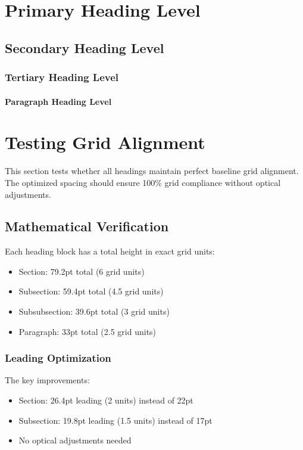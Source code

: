 \documentclass[11pt,a4paper]{article}
\begin{document}
\showgrid

\section{Primary Heading Level}
\lipsum[1][1-3]

\subsection{Secondary Heading Level}
\lipsum[2][1-3]

\subsubsection{Tertiary Heading Level}
\lipsum[3][1-3]

\paragraph{Paragraph Heading Level}
\lipsum[4][1-3]

\section{Testing Grid Alignment}
This section tests whether all headings maintain perfect baseline grid alignment.
The optimized spacing should ensure 100\% grid compliance without optical adjustments.

\subsection{Mathematical Verification}
Each heading block has a total height in exact grid units:
\begin{itemize}
\item Section: 79.2pt total (6 grid units)
\item Subsection: 59.4pt total (4.5 grid units)
\item Subsubsection: 39.6pt total (3 grid units)
\item Paragraph: 33pt total (2.5 grid units)
\end{itemize}

\subsubsection{Leading Optimization}
The key improvements:
\begin{itemize}
\item Section: 26.4pt leading (2 units) instead of 22pt
\item Subsection: 19.8pt leading (1.5 units) instead of 17pt
\item No optical adjustments needed
\end{itemize}
\end{document}
